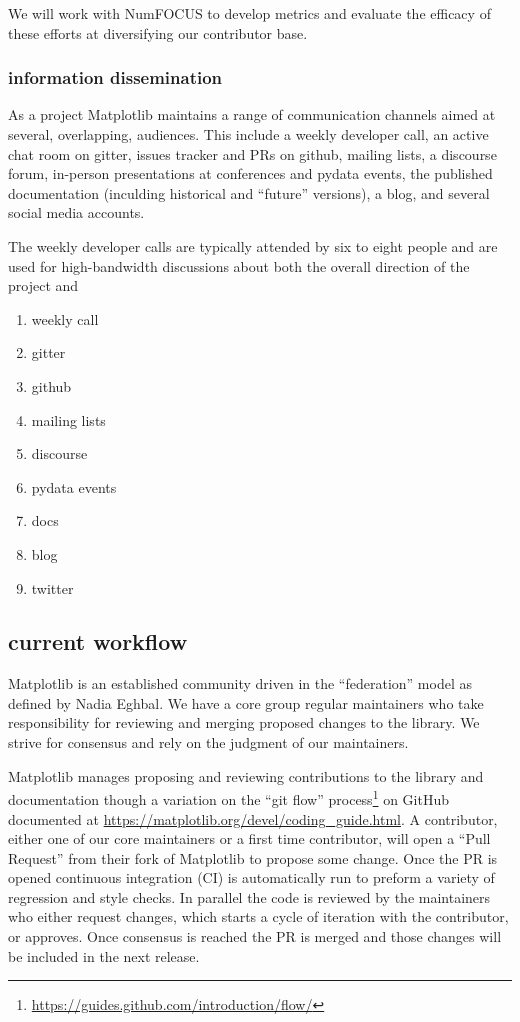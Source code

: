 \documentclass[12pt]{article}
\numberwithin{page}{section}
\begin{document}
We will work with NumFOCUS to develop metrics and evaluate the efficacy of
these efforts at diversifying our contributor base.

\subsubsection{information dissemination}

As a project Matplotlib maintains a range of communication channels
aimed at several, overlapping, audiences.  This include a weekly
developer call, an active chat room on gitter, issues tracker and PRs
on github, mailing lists, a discourse forum, in-person presentations
at conferences and pydata events, the published documentation
(inculding historical and ``future'' versions), a blog, and several
social media accounts.

The weekly developer calls are typically attended by six to eight
people and are used for high-bandwidth discussions about both the
overall direction of the project and


\begin{enumerate}
\item weekly call
\item gitter
\item github
\item mailing lists
\item discourse
\item pydata events
\item docs
\item blog
\item twitter
\end{enumerate}

\subsection{current workflow}

Matplotlib is an established community driven in the ``federation''
model as defined by Nadia Eghbal\cite{eghbal_2020}.  We have a core
group regular maintainers who take responsibility for reviewing and
merging proposed changes to the library.  We strive for consensus and
rely on the judgment of our maintainers.

Matplotlib manages proposing and reviewing contributions to the
library and documentation though a variation on the ``git flow''
process\footnote{\url{https://guides.github.com/introduction/flow/}}
on GitHub documented at
\url{https://matplotlib.org/devel/coding_guide.html}.  A contributor,
either one of our core maintainers or a first time contributor, will
open a ``Pull Request'' from their fork of Matplotlib to propose some
change.  Once the PR is opened continuous integration (CI) is
automatically run to preform a variety of regression and style checks.
In parallel the code is reviewed by the maintainers who either request
changes, which starts a cycle of iteration with the contributor, or
approves.  Once consensus is reached the PR is merged and those
changes will be included in the next release.
\end{document}

